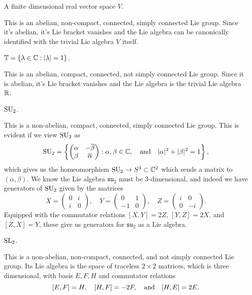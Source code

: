 \documentclass{../../templates/lkx_pset}
\begin{document}
\begin{parts}
	\begin{part}{}
		A finite dimensional real vector space $V$.
	\end{part}

	This is an abelian, non-compact, connected, simply connected Lie group.  Since it's abelian, it's Lie bracket vanishes and the Lie algebra can be canonically identified with the trivial Lie algebra $V$ itself.

	\begin{part}{}
		$\mathbb{T} = \{\lambda \in \mathbb{C} : |\lambda| = 1\}$.
	\end{part}

	This is an abelian, compact, connected, not simply connected Lie group. Since it is abelian, it's Lie bracket vanishes and the Lie algebra is the trivial Lie algebra $\mathbb{R}$.

	\begin{part}{}
		$\operatorname{SU}_2$.
	\end{part}

	This is a non-abelian, compact, connected, simply connected Lie group. This is evident if we view $\operatorname{SU}_2$ as
	\[
		\operatorname{SU}_2 = \left\{ \begin{pmatrix}\alpha & -\overline{\beta}\\ \beta & \overline{\alpha}\end{pmatrix} : \alpha,\beta\in \mathbb{C},\quad\textrm{and}\quad |\alpha|^2 + |\beta|^2=1\right\},
	\]
	which gives us the homeomorphism $\operatorname{SU}_2 \to S^3\subset \mathbb{C}^2$ which sends a matrix to $(\alpha,\beta)$. 
	We know the Lie algebra $\mathfrak{su}_2$ must be $3$-dimensional, and indeed we have generators of $\operatorname{SU}_2$ given by the matrices
	\[
		X = \begin{pmatrix}0&i\\i&0\end{pmatrix},\quad Y = \begin{pmatrix}0&1\\-1&0\end{pmatrix},\quad Z = \begin{pmatrix}i&0\\0&-i\end{pmatrix}.
	\]
	Equipped with the commutator relations $[X,Y]=2Z$, $[Y,Z]=2X$, and $[Z,X]=Y$, these give us generators for $\mathfrak{su}_2$ as a Lie algebra.

	\begin{part}{}
		$\textrm{SL}_2$.
	\end{part}

	This is a non-abelian, non-compact, connected, and not simply connected Lie group. Its Lie algebra is the space of traceless $2\times 2$ matrices, which is three dimensional, with basis $E,F,H$ and commutator relations
	\[
		[E, F] = H,\quad [H,F]=-2F,\quad\textrm{and}\quad [H,E]=2E.
	\]


\end{parts}
\end{document}
